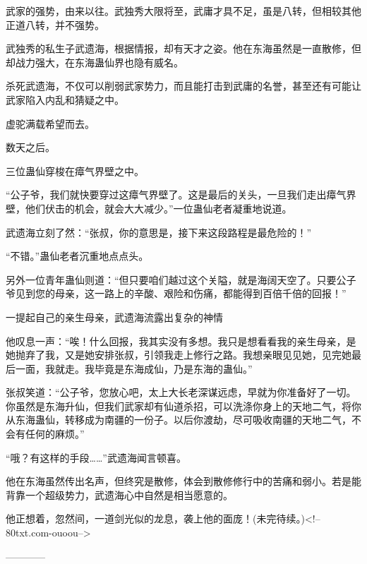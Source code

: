 \begin{this_body}
武家的强势，由来以往。武独秀大限将至，武庸才具不足，虽是八转，但相较其他正道八转，并不强势。

武独秀的私生子武遗海，根据情报，却有天才之姿。他在东海虽然是一直散修，但却战力强大，在东海蛊仙界也隐有威名。

杀死武遗海，不仅可以削弱武家势力，而且能打击到武庸的名誉，甚至还有可能让武家陷入内乱和猜疑之中。

虚驼满载希望而去。

数天之后。

三位蛊仙穿梭在瘴气界壁之中。

“公子爷，我们就快要穿过这瘴气界壁了。这是最后的关头，一旦我们走出瘴气界壁，他们伏击的机会，就会大大减少。”一位蛊仙老者凝重地说道。

武遗海立刻了然：“张叔，你的意思是，接下来这段路程是最危险的！”

“不错。”蛊仙老者沉重地点点头。

另外一位青年蛊仙则道：“但只要咱们越过这个关隘，就是海阔天空了。只要公子爷见到您的母亲，这一路上的辛酸、艰险和伤痛，都能得到百倍千倍的回报！”

一提起自己的亲生母亲，武遗海流露出复杂的神情

他叹息一声：“唉！什么回报，我其实没有多想。我只是想看看我的亲生母亲，是她抛弃了我，又是她安排张叔，引领我走上修行之路。我想亲眼见见她，见完她最后一面，我就走。我毕竟是东海成仙，乃是东海的蛊仙。”

张叔笑道：“公子爷，您放心吧，太上大长老深谋远虑，早就为你准备好了一切。你虽然是东海升仙，但我们武家却有仙道杀招，可以洗涤你身上的天地二气，将你从东海蛊仙，转移成为南疆的一份子。以后你渡劫，尽可吸收南疆的天地二气，不会有任何的麻烦。”

“哦？有这样的手段……”武遗海闻言顿喜。

他在东海虽然传出名声，但终究是散修，体会到散修修行中的苦痛和弱小。若是能背靠一个超级势力，武遗海心中自然是相当愿意的。

他正想着，忽然间，一道剑光似的龙息，袭上他的面庞！(未完待续。)<!--80txt.com-ouoou-->

------------

\end{this_body}

